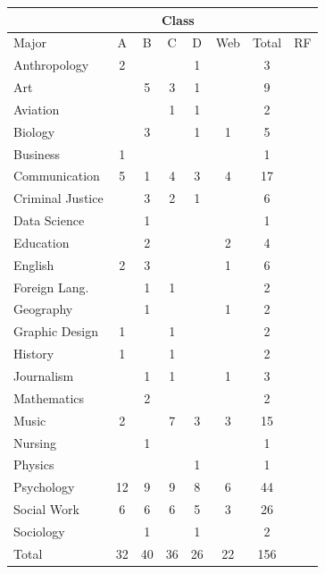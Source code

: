 \documentclass[11pt, chapterprefix=true]{scrbook}\usepackage[]{graphicx}\usepackage[]{color}
\begin{document}
\begin{exercises}
\begin{exercise}
\begin{minipage}[ht]{9cm}
{{%
\centering
\begin{tabular}{@{} l | cccccc | c @{}} \hline
& \multicolumn{5}{c}{Class } \\ \hline
Major & A & B & C & D & Web & Total & RF \\ \hline
Anthropology & 2 &   &   & 1 &   & 3 & \\
Art           &   & 5 & 3 & 1 &   & 9 & \\
Aviation      &   &   & 1 & 1 &   & 2 & \\
Biology       &   & 3 &   & 1 & 1 & 5 & \\
Business      & 1 &   &   &   &   & 1 & \\
Communication & 5 & 1 & 4 & 3 & 4 & 17 & \\
Criminal Justice &  & 3 & 2 & 1 &   & 6 & \\
Data Science  &   & 1 &   &   &   & 1 & \\
Education     &   & 2 &   &   & 2 & 4 & \\
English       & 2 & 3 &   &   & 1 & 6 & \\
Foreign Lang. &   & 1 & 1 &   &   & 2 & \\
Geography     &   & 1 &   &   & 1 & 2 & \\
Graphic Design & 1 &  & 1 &   &   & 2 & \\
History       & 1 &   & 1 &   &   & 2 & \\
Journalism    &   & 1 & 1 &   & 1 & 3 & \\
Mathematics   &   & 2 &   &   &   & 2 & \\
Music         & 2 &   & 7 & 3 & 3 & 15 & \\
Nursing       &   & 1 &   &   &   & 1 & \\
Physics       &   &   &   & 1 &   & 1 & \\
Psychology    &12 & 9 & 9 & 8 & 6 & 44 & \\
Social Work   & 6 & 6 & 6 & 5 & 3 & 26 & \\
Sociology      &   & 1 &   & 1 &   & 2 & \\ \hline
Total         &32 &40 &36 &26 &22 &156 &   \\ \hline
\end{tabular}
}}
\end{minipage}
\begin{minipage}[ht]{6cm}
    

\end{minipage}
\end{exercise}
\end{exercises}
\end{document}
